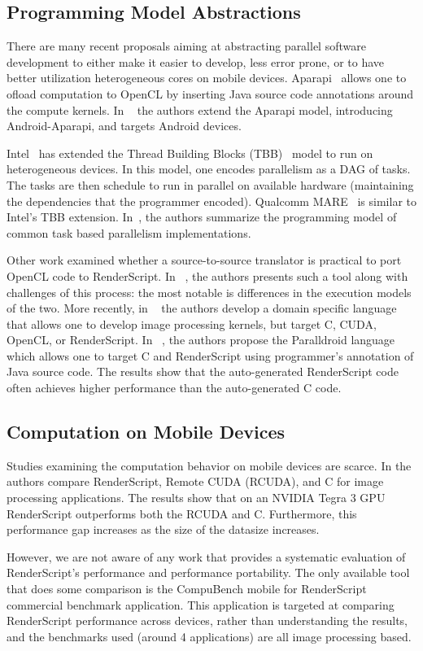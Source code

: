 \subsection{Programming Model Abstractions}


There are many recent proposals aiming at abstracting parallel software development to either make it easier to develop, less error prone, or to have better utilization heterogeneous cores on mobile devices. Aparapi~\cite{Aparapi_web} allows one to ofload computation to OpenCL by inserting Java source code annotations around the compute kernels. In ~\cite{6704508} the authors extend the Aparapi model, introducing Android-Aparapi, and targets Android devices.

Intel~\cite{barik2014efficient} has extended the Thread Building Blocks (TBB)~\cite{reinders2007intel} model to run on heterogeneous devices. In this model, one encodes
	parallelism as a DAG of tasks.
The tasks are then schedule to run in parallel on available hardware (maintaining the dependencies that the programmer encoded).
Qualcomm MARE~\cite{MARE_qc} is similar to Intel's TBB extension.
In~\cite{khaldi2013task}, the authors summarize the programming model of
	common task based parallelism implementations.

Other work examined whether a source-to-source translator is practical to 
	port OpenCL code to RenderScript.
In ~\cite{yang2012o2render}, the authors presents such a tool along with challenges of this process:
the most notable is differences in the execution models of the two.
More recently, in ~\cite{hipacc} the authors develop a domain specific language that allows
one to develop image processing kernels, but target C, CUDA, OpenCL, or RenderScript. In ~\cite{alejandro2014performance}, the authors
propose the Paralldroid language which allows one to target C and RenderScript using 
programmer's annotation of Java source code. The results show that the auto-generated
RenderScript code often achieves higher performance than the auto-generated
C code. 

\subsection{Computation on Mobile Devices}

Studies examining the computation behavior on mobile devices are scarce.
In \cite{kemp2013using} the authors compare RenderScript, Remote CUDA (RCUDA), and C for image processing applications. The results show that on an NVIDIA Tegra 3 GPU
RenderScript outperforms both the RCUDA and
C. Furthermore, this performance gap increases as the size of
the datasize increases.

However, we are not aware of any work that provides a
systematic evaluation of RenderScript's performance and performance portability.
The only available tool that does some comparison is the CompuBench mobile
for RenderScript~\cite{compuBenchMobile} commercial benchmark application. 
This application is targeted at comparing RenderScript performance across devices, rather than understanding the results, and the benchmarks used (around 4 applications) are all image processing based.


